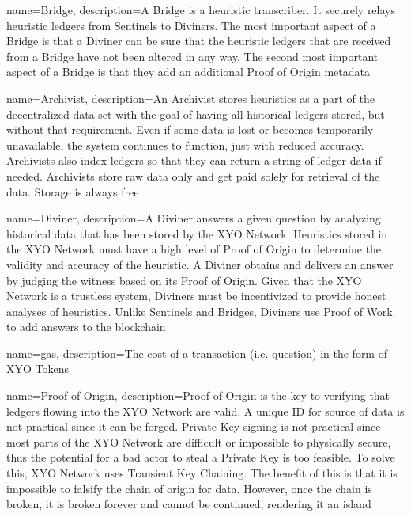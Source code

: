 \documentclass{article}
\begin{document}
{
    name={Bridge},
    description={A Bridge is a heuristic transcriber. It securely relays heuristic ledgers from Sentinels to Diviners. The most important aspect of a Bridge is that a Diviner can be sure that the heuristic ledgers that are received from a Bridge have not been altered in any way. The second most important aspect of a Bridge is that they add an additional Proof of Origin metadata}
}

{
    name={Archivist},
    description={An Archivist stores heuristics as a part of the decentralized data set with the goal of having all historical ledgers stored, but without that requirement. Even if some data is lost or becomes temporarily unavailable, the system continues to function, just with reduced accuracy. Archivists also index ledgers so that they can return a string of ledger data if needed. Archivists store raw data only and get paid solely for retrieval of the data. Storage is always free}
}

{
    name={Diviner},
    description={A Diviner answers a given question by analyzing historical data that has been stored by the XYO Network. Heuristics stored in the XYO Network must have a high level of Proof of Origin to determine the validity and accuracy of the heuristic. A Diviner obtains and delivers an answer by judging the witness based on its Proof of Origin. Given that the XYO Network is a trustless system, Diviners must be incentivized to provide honest analyses of heuristics. Unlike Sentinels and Bridges, Diviners use Proof of Work to add answers to the blockchain}
}

{
    name={gas},
    description={The cost of a transaction (i.e. question) in the form of XYO Tokens}
}

{
    name={Proof of Origin},
    description={Proof of Origin is the key to verifying that ledgers flowing into the XYO Network are valid. A unique ID for source of data is not practical since it can be forged. Private Key signing is not practical since most parts of the XYO Network are difficult or impossible to physically secure, thus the potential for a bad actor to steal a Private Key is too feasible. To solve this, XYO Network uses Transient Key Chaining. The benefit of this is that it is impossible to falsify the chain of origin for data. However, once the chain is broken, it is broken forever and cannot be continued, rendering it an island}
}
\end{document}

